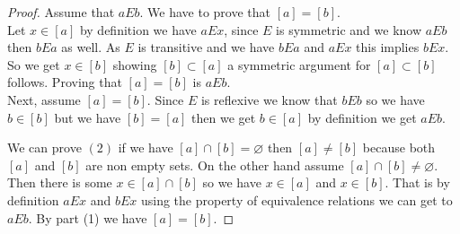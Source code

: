 \documentclass[16pt,a4paper]{article}
\theoremstyle{definition}
\begin{document}
\begin{proof}
Assume that $aEb$. We have to prove that $[a] = [b]$. \\
Let $x\in [a]$ by definition we have $aEx$, since $E$ is symmetric and we know $aEb$ then $bEa$ as well. As $E$ is transitive and we have $bEa$ and $aEx$ this implies $bEx$. So we get $x\in [b]$ showing $[b] \subset [a]$ a symmetric argument for $[a] \subset [b]$ follows. Proving that $[a] = [b]$ is $aEb$. \\
 Next, assume $[a] = [b]$. Since $E$ is reflexive we know that $bEb$ so we have $b\in [b]$ but we have $[b] = [a]$ then we get $b\in [a]$ by definition we get $aEb$. 
 
 
We can prove $(2)$ if we have $[a] \cap [b] = \varnothing$ then $[a] \neq [b]$ because both $[a]$ and $[b]$ are non empty sets. On the other hand assume $[a] \cap [b] \neq \varnothing$. Then there is some $x \in [a] \cap [b]$ so we have $x \in [a]$ and $x\in [b]$. That is by definition $aEx$ and $bEx$ using the property of equivalence relations we can get to $aEb$. By part (1) we have $[a] = [b]$. 
\end{proof}




\newpage
\end{document}
